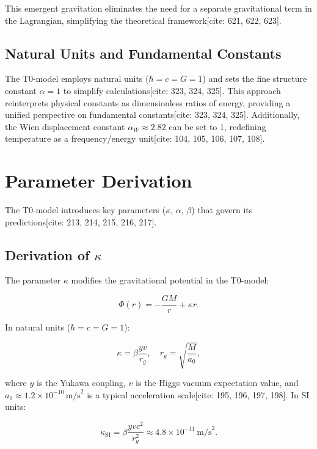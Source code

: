 \documentclass[a4paper,12pt]{article}
\theoremstyle{definition}
\theoremstyle{remark}
\begin{document}
	This emergent gravitation eliminates the need for a separate gravitational term in the Lagrangian, simplifying the theoretical framework[cite: 621, 622, 623].
	
	\subsection{Natural Units and Fundamental Constants}
	
	The T0-model employs natural units (\( \hbar = c = G = 1 \)) and sets the fine structure constant \( \alpha = 1 \) to simplify calculations[cite: 323, 324, 325]. This approach reinterprets physical constants as dimensionless ratios of energy, providing a unified perspective on fundamental constants[cite: 323, 324, 325]. Additionally, the Wien displacement constant \(\alpha_W \approx 2.82\) can be set to 1, redefining temperature as a frequency/energy unit[cite: 104, 105, 106, 107, 108].
	
	\section{Parameter Derivation}
	
	The T0-model introduces key parameters (\(\kappa\), \(\alpha\), \(\beta\)) that govern its predictions[cite: 213, 214, 215, 216, 217].
	
	\subsection{Derivation of \(\kappa\)}
	
	The parameter \(\kappa\) modifies the gravitational potential in the T0-model:
	
	\begin{equation}
		\Phi(r) = -\frac{G M}{r} + \kappa r.
	\end{equation}
	
	In natural units (\( \hbar = c = G = 1 \)):
	
	\begin{equation}
		\kappa = \beta \frac{y v}{r_g}, \quad r_g = \sqrt{\frac{M}{a_0}},
	\end{equation}
	
	where \( y \) is the Yukawa coupling, \( v \) is the Higgs vacuum expectation value, and \( a_0 \approx 1.2 \times 10^{-10} \, \text{m/s}^2 \) is a typical acceleration scale[cite: 195, 196, 197, 198]. In SI units:
	
	\begin{equation}
		\kappa_{\text{SI}} = \beta \frac{y v c^2}{r_g^2} \approx 4.8 \times 10^{-11} \, \text{m/s}^2.
	\end{equation}
	
\end{document}
